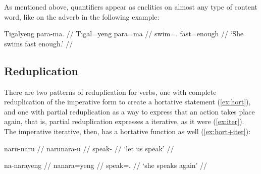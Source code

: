 As mentioned above, quantifiers appear as enclitics on almost any type of 
content word, like on the adverb  in the following example:

\ex
\begingl
	\gla Tigalyeng para-ma. //
	\glb Tigal=yeng para=ma //
	\glc swim=\TsgF{}.\Aarg{} fast=enough //
	\glft `She swims fast enough.' //
\endgl

% 
% 

\xe


\subsection{Reduplication}
\label{subsec:reduplication}

There are two patterns of reduplication for verbs, one with complete 
reduplication of the imperative form to create a hortative statement 
(\ref{ex:hort}), and one with partial reduplication as a way to express that an 
action takes place again, that is, partial reduplication expresses a 
iterative, as it were (\ref{ex:iter}). The imperative iterative, then, has a 
hortative function as well (\ref{ex:hort+iter}):

\pex
\a\label{ex:hort}\begingl%
	\gla naru-naru //
	\glb naru\til{}nara-u //
	\glc \Hort{}\til{}speak-\Imp{} //
	\glft `let us speak' //
\endgl

\a\label{ex:iter}\begingl
	\gla na-narayeng //
	\glb na\til{}nara=yeng //
	\glc \Iter{}\til{}speak=\TsgF{}.\Aarg{} //
	\glft `she speaks again' //
\endgl

